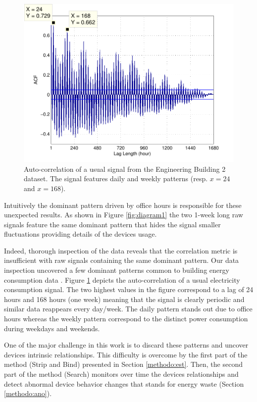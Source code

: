 \begin{figure}[t!]
\begin{center}
\includegraphics[width=.45\textwidth]{img/acf_101A1_GHP-eps-converted-to.pdf}
\caption{Auto-correlation of a usual signal from the Engineering Building 2 dataset.
The signal features daily and weekly patterns (resp. $x=24$ and $x=168$).}
\label{fig:autocorr}
\end{center}
\end{figure}

Intuitively the dominant pattern driven by office hours is responsible for these unexpected results.
As shown in Figure \ref{fig:diagram1} the two 1-week long raw signals feature the same dominant pattern that hides the signal smaller fluctuations providing details of the devices usage.

Indeed, thorough inspection of the data reveals that the correlation metric is insufficient with raw signals containing the same dominant pattern.
Our data inspection uncovered a few dominant patterns common to building energy consumption data \cite{wrinch:pes2012}.
Figure \ref{fig:autocorr} depicts the auto-correlation of a usual electricity consumption signal.
The two highest values in the figure correspond to a lag of 24 hours and 168 hours (one week) meaning that the signal is clearly periodic and similar data reappears every day/week.
The daily pattern stands out due to office hours whereas the weekly pattern correspond to the distinct power consumption during weekdays and weekends.

One of the major challenge in this work is to discard these patterns and uncover devices intrinsic relationships.
This difficulty is overcome by the first part of the method (Strip and Bind) presented in Section \ref{methodo:est}.
Then, the second part of the method (Search) monitors over time the devices relationships and detect abnormal device behavior changes that stands for energy waste (Section \ref{methodo:ano}).
